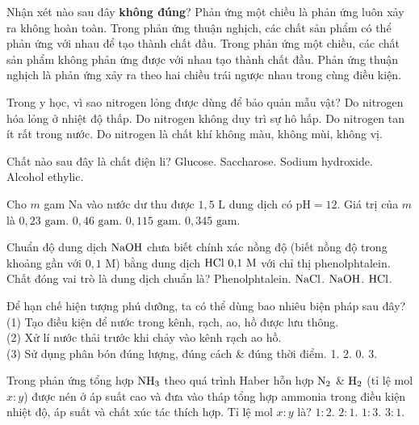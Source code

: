 \documentclass[12pt,a4paper]{article}
\begin{document}
\begin{ex}
Nhận xét nào sau đây \textbf{không đúng}?
\choice
{Phản ứng một chiều là phản ứng luôn xảy ra không hoàn toàn.}
{Trong phản ứng thuận nghịch, các chất sản phẩm có thể phản ứng với nhau để tạo thành chất đầu.}
{Trong phản ứng một chiều, các chất sản phẩm không phản ứng được với nhau tạo thành chất đầu.}
{Phản ứng thuận nghịch là phản ứng xảy ra theo hai chiều trái ngược nhau trong cùng điều kiện.}
\loigiai{}
\end{ex}

\begin{ex}
Trong y học, vì sao nitrogen lỏng được dùng để bảo quản mẫu vật?
\choice
{Do nitrogen hóa lỏng ở nhiệt độ thấp.}
{Do nitrogen không duy trì sự hô hấp.}
{Do nitrogen tan ít rất trong nước.}
{Do nitrogen là chất khí không màu, không mùi, không vị.}
\loigiai{}
\end{ex}

\begin{ex}
Chất nào sau đây là chất điện li?
\choice
{Glucose.}
{Saccharose.}
{Sodium hydroxide.}
{Alcohol ethylic.}
\loigiai{}
\end{ex}

\begin{ex}
Cho $m$ gam Na vào nước dư thu được $1{,}5\text{ L}$ dung dịch có $\text{pH} = 12$. Giá trị của $m$ là
\choice
{$0{,}23\text{ gam}$.}
{$0{,}46\text{ gam}$.}
{$0{,}115\text{ gam}$.}
{$0{,}345\text{ gam}$.}
\loigiai{}
\end{ex}

\begin{ex}
Chuẩn độ dung dịch $\ce{NaOH}$ chưa biết chính xác nồng độ (biết nồng độ trong khoảng gần với $0{,}1\text{ M}$) bằng dung dịch $\ce{HCl}\ 0{,}1\text{ M}$ với chỉ thị phenolphtalein. Chất đóng vai trò là dung dịch chuẩn là?
\choice
{Phenolphtalein.}
{$\ce{NaCl}$.}
{$\ce{NaOH}$.}
{$\ce{HCl}$.}
\loigiai{}
\end{ex}

\begin{ex}
Để hạn chế hiện tượng phú dưỡng, ta có thể dùng bao nhiêu biện pháp sau đây?\\
(1) Tạo điều kiện để nước trong kênh, rạch, ao, hồ được lưu thông.\\
(2) Xử lí nước thải trước khi chảy vào kênh rạch ao hồ.\\
(3) Sử dụng phân bón đúng lượng, đúng cách \& đúng thời điểm.
\choice
{1.}
{2.}
{0.}
{3.}
\loigiai{}
\end{ex}

\begin{ex}
Trong phản ứng tổng hợp $\ce{NH3}$ theo quá trình Haber hỗn hợp $\ce{N2}$ \& $\ce{H2}$ (tỉ lệ mol $x : y$) được nén ở áp suất cao và đưa vào tháp tổng hợp ammonia trong điều kiện nhiệt độ, áp suất và chất xúc tác thích hợp. Tỉ lệ mol $x : y$ là?
\choice
{$1 : 2$.}
{$2 : 1$.}
{$1 : 3$.}
{$3 : 1$.}
\loigiai{}
\end{ex}
\end{document}
